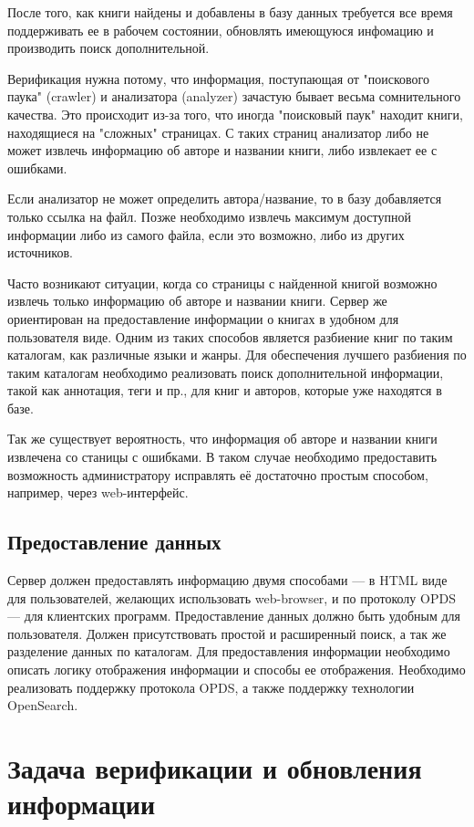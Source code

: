 \documentclass[a4paper]{report}
\begin{document}
После того, как книги найдены и добавлены в базу данных требуется все время поддерживать ее в рабочем состоянии, обновлять имеющуюся инфомацию и производить поиск дополнительной.

Верификация нужна потому, что информация, поступающая от "поискового паука" (crawler) и анализатора (analyzer) зачастую бывает весьма сомнительного качества. Это происходит из-за того, что иногда "поисковый паук" находит книги, находящиеся на "сложных" страницах. С таких страниц анализатор либо не может извлечь информацию об авторе и названии книги, либо извлекает ее с ошибками. 

Если анализатор не может определить автора/название, то в базу добавляется только ссылка на файл. Позже необходимо извлечь максимум доступной информации либо из самого файла, если это возможно, либо из других источников.

Часто возникают ситуации, когда со страницы с найденной книгой возможно извлечь только информацию об авторе и названии книги. Сервер же ориентирован на предоставление информации о книгах в удобном для пользователя виде. Одним из таких способов является разбиение книг по таким каталогам, как различные языки и жанры. Для обеспечения лучшего разбиения по таким каталогам необходимо реализовать поиск дополнительной информации, такой как аннотация, теги и пр., для книг и авторов, которые уже находятся в базе.


Так же существует вероятность, что информация об авторе и названии книги извлечена со станицы с ошибками. В таком случае необходимо предоставить возможность администратору исправлять её достаточно простым способом, например, через web-интерфейс.


\subsection{Предоставление данных}

Сервер должен предоставлять информацию двумя способами --- в HTML виде для пользователей, желающих использовать web-browser, и по протоколу OPDS --- для клиентских программ. Предоставление данных должно быть удобным для пользователя. Должен присутствовать простой и расширенный поиск, а так же разделение данных по каталогам. Для предоставления информации необходимо описать логику отображения информации и способы ее отображения. Необходимо реализовать поддержку протокола OPDS, а также поддержку технологии OpenSearch.

\newpage
\section{Задача верификации и обновления информации}
\end{document}
